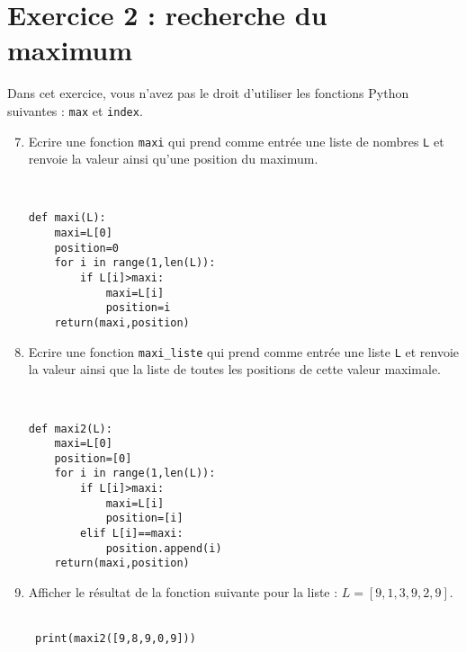 \section*{Exercice 2 : recherche du maximum}
\noindent Dans cet exercice, vous n'avez pas le droit d'utiliser les fonctions Python suivantes : \verb?max? et \verb?index?.
\begin{enumerate}
\setcounter{enumi}{6}
\item Ecrire une fonction \verb?maxi? qui prend comme entrée une liste de nombres \verb?L? et renvoie la valeur ainsi qu'une position du maximum.
\begin{solution}~ \\\vspace{-0.7cm}
\begin{verbatim}
def maxi(L):
    maxi=L[0]
    position=0
    for i in range(1,len(L)):
        if L[i]>maxi:
            maxi=L[i]
            position=i
    return(maxi,position)
\end{verbatim}
\end{solution}
\item Ecrire une fonction \verb?maxi_liste? qui prend comme entrée une liste \verb?L? et renvoie la valeur ainsi que la liste de toutes les positions de cette valeur maximale. 
\begin{solution}~ \\\vspace{-0.7cm}
\begin{verbatim}
def maxi2(L):
    maxi=L[0]
    position=[0]
    for i in range(1,len(L)):
        if L[i]>maxi:
            maxi=L[i]
            position=[i]
        elif L[i]==maxi:
            position.append(i)
    return(maxi,position)
\end{verbatim}
\end{solution}
\item Afficher le résultat de la fonction suivante pour la liste : $L=[9,1,3,9,2,9]$.
\begin{solution}~ \\\vspace{-0.7cm}
\verb? print(maxi2([9,8,9,0,9]))?
\end{solution}
\end{enumerate}

